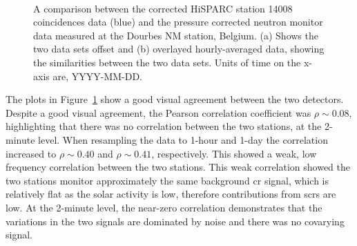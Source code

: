 \begin{figure}[ht!]
	\centering
	 \\

	
	\caption{A comparison between the corrected HiSPARC station 14008 coincidences data (blue) and the pressure corrected neutron monitor data measured at the Dourbes NM station, Belgium. (a) Shows the two data sets offset and (b) overlayed hourly-averaged data, showing the similarities between the two data sets. Units of time on the x-axis are, YYYY-MM-DD.}
	\label{fig:14008_vs_DRBS}
\end{figure}


The plots in Figure~\ref{fig:14008_vs_DRBS} show a good visual agreement between the two detectors. Despite a good visual agreement, the Pearson correlation coefficient was $\rho \sim 0.08$, highlighting that there was no correlation between the two stations, at the 2-minute level. When resampling the data to 1-hour and 1-day the correlation increased to $\rho \sim 0.40$ and $\rho \sim 0.41$, respectively. This showed a weak, low frequency correlation between the two stations. This weak correlation showed the two stations monitor approximately the same background \gls{cr} signal, which is relatively flat as the solar activity is low, therefore contributions from \glspl{scr} are low. At the 2-minute level, the near-zero correlation demonstrates that the variations in the two signals are dominated by noise and there was no covarying signal.

